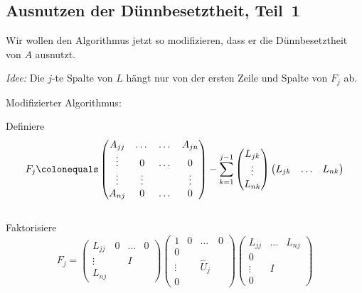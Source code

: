 \subsection{Ausnutzen der Dünnbesetztheit, Teil~1}

Wir wollen den Algorithmus jetzt so modifizieren, dass er die Dünnbesetztheit von $A$
ausnutzt.

\medskip

\emph{Idee:} Die $j$-te Spalte von $L$ hängt nur von der ersten Zeile und Spalte von $F_j$ ab.

Modifizierter Algorithmus:

\begin{algorithm}[H]
 \SetAlgoLined

 {
  Definiere
 \begin{equation*}
  F_j
  \colonequals
  \begin{pmatrix}
   A_{jj} & \dots & \dots & A_{jn} \\
   \vdots & 0 & \dots & 0 \\
   \vdots & \vdots & & \vdots \\
   A_{nj} & 0 & \dots & 0
  \end{pmatrix}
  -
  \sum_{k=1}^{j-1}
  \begin{pmatrix}
   L_{jk} \\
   \vdots \\
   L_{nk}
  \end{pmatrix}
  \begin{pmatrix}
   L_{jk} & \ldots & L_{nk}
  \end{pmatrix}
  \end{equation*}
 \\
 Faktorisiere
 \begin{equation*}
  F_j
  =
  \begin{pmatrix}
   L_{jj} & 0 & \dots & 0 \\
   \vdots & & I & \\
   L_{nj} & & &
  \end{pmatrix}
  \begin{pmatrix}
   1 & 0 & \dots & 0 \\
   0 \\
   \vdots & & \widehat{U}_j \\
   0
  \end{pmatrix}
  \begin{pmatrix}
   L_{jj} & \dots & L_{nj} \\
   0 \\
   \vdots & I & \\
   0 & &
  \end{pmatrix}
 \end{equation*}
 }
\end{algorithm}

